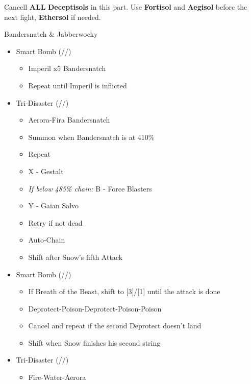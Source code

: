 Cancell \textbf{ALL} \textbf{Deceptisols} in this part.
Use \textbf{Fortisol} and \textbf{Aegisol} before the next fight, \textbf{Ethersol} if needed.

	\renewcommand{\second}{[2] Devastation (\sab/\com/\com)}
	\renewcommand{\fifth}{[5] Smart Bomb (\sab/\rav/\rav)}
	\renewcommand{\sixth}{[6] Tri-Disaster (\rav/\rav/\rav)}

	\begin{battle}[0:55]{Bandersnatch \& Jabberwocky}
		\begin{itemize}
			\item \fifth
			      \begin{itemize}
				      \item Imperil x5 Bandersnatch
				      \item Repeat until Imperil is inflicted
			      \end{itemize}
			\item \sixth
			      \begin{itemize}
				      \item Aerora-Fira Bandersnatch
				      \item Summon when Bandersnatch is at 410\%
				      \item Repeat
				      \item X - Gestalt
				      \item {\it If below 485\% chain:} B - Force Blasters
				      \item Y - Gaian Salvo
				      \item Retry if not dead
				      \item Auto-Chain
				      \item Shift after Snow's fifth Attack
			      \end{itemize}
			\item \fifth
			      \begin{itemize}
				      \item If Breath of the Beast, shift to [3]/[1] until the attack is done
				      \item Deprotect-Poison-Deprotect-Poison-Poison
				      \item Cancel and repeat if the second Deprotect doesn't land
				      \item Shift when Snow finishes his second string
			      \end{itemize}
			\item \sixth
			      \begin{itemize}
				      \item Fire-Water-Aerora

\end{itemize}
\end{itemize}
\end{battle}
